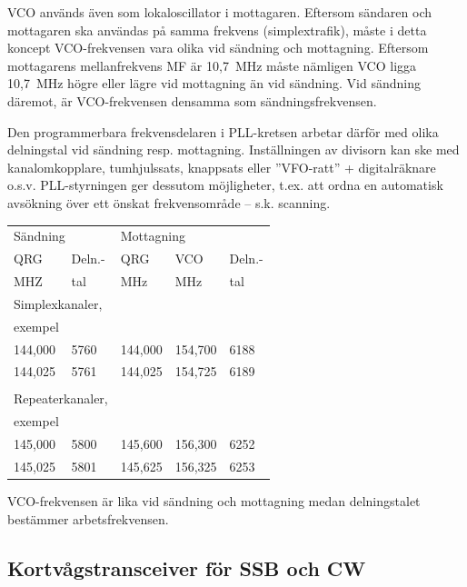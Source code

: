 VCO används även som lokaloscillator i mottagaren. Eftersom sändaren
och mottagaren ska användas på samma frekvens (simplextrafik), måste
i detta koncept VCO-frekvensen vara olika vid sändning och
mottagning. Eftersom mottagarens mellanfrekvens MF är 10,7~MHz måste
nämligen VCO ligga 10,7~MHz högre eller lägre vid mottagning än vid
sändning. Vid sändning däremot, är VCO-frekvensen densamma som
sändningsfrekvensen.

Den programmerbara frekvensdelaren i PLL-kretsen arbetar därför med
olika delningstal vid sändning resp. mottagning. Inställningen av
divisorn kan ske med kanalomkopplare, tumhjulssats, knappsats eller
''VFO-ratt'' + digitalräknare o.s.v. PLL-styrningen ger dessutom
möjligheter, t.ex. att ordna en automatisk avsökning över ett önskat
frekvensområde -- s.k. scanning.

\begin{table}[h]
  \begin{tabular}{ll|lll}
    \multicolumn{2}{l|}{Sändning} &
    \multicolumn{3}{l}{Mottagning} \\
    QRG & Deln.- & QRG & VCO & Deln.- \\
    MHZ & tal    & MHz & MHz & tal \\
    \hline
    \multicolumn{2}{l|}{Simplexkanaler,} & & & \\
    \multicolumn{2}{l|}{exempel} & & & \\
    144,000 & 5760 & 144,000 & 154,700 & 6188 \\
    144,025 & 5761 & 144,025 & 154,725 & 6189 \\
    & & & & \\
    \multicolumn{2}{l|}{Repeaterkanaler,} & & & \\
    \multicolumn{2}{l|}{exempel} & & & \\
    145,000 & 5800 & 145,600 & 156,300 & 6252 \\
    145,025 & 5801 & 145,625 & 156,325 & 6253 \\
  \end{tabular}
\end{table}


VCO-frekvensen är lika vid sändning och mottagning medan delningstalet
bestämmer arbetsfrekvensen.

\subsection{Kortvågstransceiver för SSB och CW}

